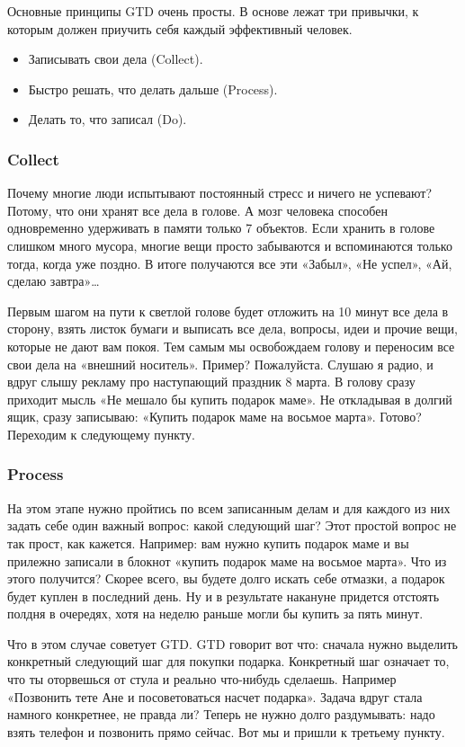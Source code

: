 Основные принципы GTD очень просты. В основе лежат три привычки, к которым должен приучить себя каждый эффективный человек.
\begin{itemize}
  \item Записывать свои дела (Collect).
  \item Быстро решать, что делать дальше (Process).
  \item Делать то, что записал (Do).
\end{itemize}


\subsubsection{Collect }

Почему многие люди испытывают постоянный стресс и ничего не успевают? Потому, что они хранят все дела в голове. А мозг человека способен одновременно удерживать в памяти только 7 объектов. Если хранить в голове слишком много мусора, многие вещи просто забываются и вспоминаются только тогда, когда уже поздно. В итоге получаются все эти «Забыл», «Не успел», «Ай, сделаю завтра»…

Первым шагом на пути к светлой голове будет отложить на 10 минут все дела в сторону, взять листок бумаги и выписать все дела, вопросы, идеи и прочие вещи, которые не дают вам покоя. Тем самым мы освобождаем голову и переносим все свои дела на «внешний носитель».
Пример? Пожалуйста. Слушаю я радио, и вдруг слышу рекламу про наступающий праздник 8 марта. В голову сразу приходит мысль «Не мешало бы купить подарок маме». Не откладывая в долгий ящик, сразу записываю: «Купить подарок маме на восьмое марта».
Готово? Переходим к следующему пункту.

\subsubsection{Process }

На этом этапе нужно пройтись по всем записанным делам и для каждого из них задать себе один важный вопрос: какой следующий шаг?
Этот простой вопрос не так прост, как кажется. Например: вам нужно купить подарок маме и вы прилежно записали в блокнот «купить подарок маме на восьмое марта».
Что из этого получится? Скорее всего, вы будете долго искать себе отмазки, а подарок будет куплен в последний день. Ну и в результате накануне придется отстоять полдня в очередях, хотя на неделю раньше могли бы купить за пять минут.

Что в этом случае советует GTD.
GTD говорит вот что: сначала нужно выделить конкретный следующий шаг для покупки подарка. Конкретный шаг означает то, что ты оторвешься от стула и реально что-нибудь сделаешь. Например «Позвонить тете Ане и посоветоваться насчет подарка». Задача вдруг стала намного конкретнее, не правда ли? Теперь не нужно долго раздумывать: надо взять телефон и позвонить прямо сейчас.
Вот мы и пришли к третьему пункту.

